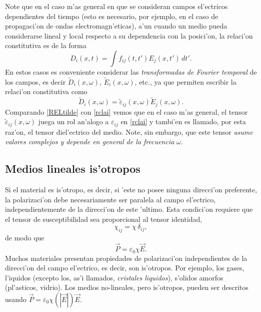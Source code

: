 Note que en el caso m'as general en que se consideran campos el'ectricos dependientes del tiempo (esto es necesario, por ejemplo, en el caso de propagaci'on de ondas electromagn'eticas), a'un cuando un medio pueda considerarse lineal y local respecto a su dependencia con la posici'on, la relaci'on constitutiva es de la forma
\begin{equation}
D_i(x,t)=\int f_{ij}(t,t')E_j(x,t')\,dt'.
\end{equation}
En estos casos es conveniente considerar las \textit{transformadas de Fourier temporal} de los campos, es decir $\tilde{D}_i(x,\omega)$, $\tilde{E}_i(x,\omega)$, etc., ya que permiten escribir la relaci'on constitutiva como
\begin{equation}\label{RELtilde}
\tilde{D}_i(x,\omega)=\tilde{\varepsilon}_{ij}(x,\omega)\tilde{E}_j(x,\omega). 
\end{equation}
Comparando \eqref{RELtilde} con \eqref{rclai} vemos que en el caso m'as general, el tensor $\tilde{\varepsilon}_{ij}(x,\omega)$ juega un rol an'alogo a $\varepsilon_{ij}$ en \eqref{rclai} y tambi'en es llamado, por esta raz'on, el tensor diel'ectrico del medio. Note, sin embargo, que este tensor \textit{asume valores complejos y depende en general de la frecuencia} $\omega$.


\subsection{Medios lineales is'otropos}\label{sec:iso}
Si el material es is'otropo, es decir, si 'este no posee ninguna direcci'on
preferente, la polarizaci'on debe necesariamente ser paralela al campo
el'ectrico, independientemente de la direcci'on de este 'ultimo. Esta condici'on requiere que el tensor de susceptibilidad sea proporcional al tensor identidad,
\begin{equation}
\chi_{ij}=\chi\,\delta_{ij},
\end{equation}
de modo que
\begin{equation}
\vec{P}=\varepsilon_0\chi\vec{E}.
\end{equation}
Muchos materiales presentan propiedades de polarizaci'on independientes de
la direcci'on del campo el'ectrico, es decir, son is'otropos. Por ejemplo, los
gases, l'iquidos (excepto los, as'i llamados, \textit{cristales liquidos}), s'olidos amorfos (pl'asticos, vidrio).
Los medios no-lineales, pero is'otropos, pueden ser descritos usando
$\vec{P}=\varepsilon_0\chi(|\vec{E}|)\vec{E}$.

